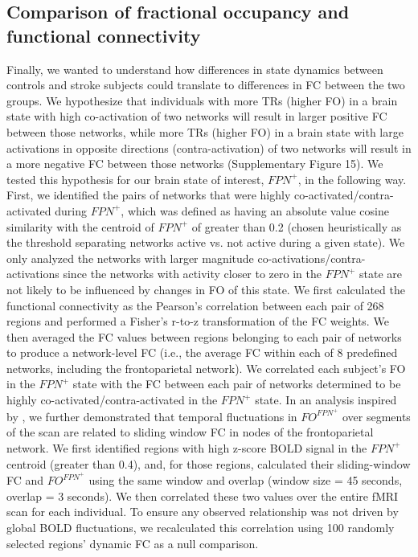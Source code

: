 \documentclass[phd,tocprelim]{cornell}
\begin{document}
    \subsection*{Comparison of fractional occupancy and functional connectivity}
    Finally, we wanted to understand how differences in state dynamics between controls and stroke subjects could translate to differences in FC between the two groups. We hypothesize that individuals with more TRs (higher FO) in a brain state with high co-activation of two networks will result in larger positive FC between those networks, while more TRs (higher FO) in a brain state with large activations in opposite directions (contra-activation) of two networks will result in a more negative FC between those networks (Supplementary Figure 15). We tested this hypothesis for our brain state of interest, $FPN^+$, in the following way. First, we identified the pairs of networks that were highly co-activated/contra-activated during $FPN^+$, which was defined as having an absolute value cosine similarity with the centroid of $FPN^+$ of greater than 0.2 (chosen heuristically as the threshold separating networks active vs. not active during a given state). We only analyzed the networks with larger magnitude co-activations/contra-activations since the networks with activity closer to zero in the $FPN^+$ state are not likely to be influenced by changes in FO of this state. We first calculated the functional connectivity as the Pearson's correlation between each pair of 268 regions and performed a Fisher's r-to-z transformation of the FC weights. We then averaged the FC values between regions belonging to each pair of networks to produce a network-level FC (i.e., the average FC within each of 8 predefined networks, including the frontoparietal network). We correlated each subject's FO in the $FPN^+$ state with the FC between each pair of networks determined to be highly co-activated/contra-activated in the $FPN^+$ state.
    In an analysis inspired by \cite{Baker2014-zt}, we further demonstrated that temporal fluctuations in $FO^{FPN^+}$ over segments of the scan are related to sliding window FC in nodes of the frontoparietal network. We first identified regions with high z-score BOLD signal in the $FPN^+$ centroid (greater than 0.4), and, for those regions, calculated their sliding-window FC and $FO^{FPN^+}$ using the same window and overlap (window size = 45 seconds, overlap = 3 seconds). We then correlated these two values over the entire fMRI scan for each individual. To ensure any observed relationship was not driven by global BOLD fluctuations, we recalculated this correlation using 100 randomly selected regions' dynamic FC as a null comparison.
    
\end{document}
